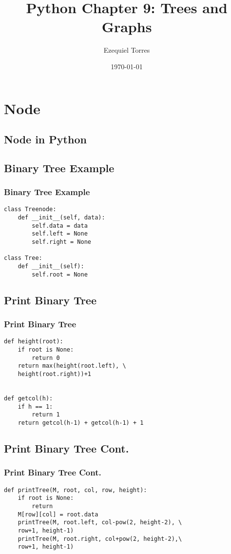 \documentclass{beamer}
\begin{document}
\title{Python Chapter 9: Trees and Graphs}
\author{Ezequiel Torres}
\date{\today}
\frame{\titlepage}

\section{Node}
\subsection{Node in Python}


\begin{frame}[fragile]
\subsection{Binary Tree Example}
\frametitle{Binary Tree Example}
\begin{lstlisting}
class Treenode:
    def __init__(self, data):
        self.data = data
        self.left = None
        self.right = None
 
class Tree:
    def __init__(self):
        self.root = None\end{lstlisting}
\end{frame}

\begin{frame}[fragile]
\subsection{Print Binary Tree}
\frametitle{Print Binary Tree}
\begin{lstlisting}
def height(root):
    if root is None:
        return 0
    return max(height(root.left), \
    height(root.right))+1
 
 
def getcol(h):
    if h == 1:
        return 1
    return getcol(h-1) + getcol(h-1) + 1
\end{lstlisting}
\end{frame}

\begin{frame}[fragile]
\subsection{Print Binary Tree Cont.}
\frametitle{Print Binary Tree Cont.}
\begin{lstlisting}
def printTree(M, root, col, row, height):
    if root is None:
        return
    M[row][col] = root.data
    printTree(M, root.left, col-pow(2, height-2), \ 
    row+1, height-1)
    printTree(M, root.right, col+pow(2, height-2),\ 
    row+1, height-1)
\end{lstlisting}
\end{frame}
\end{document}
